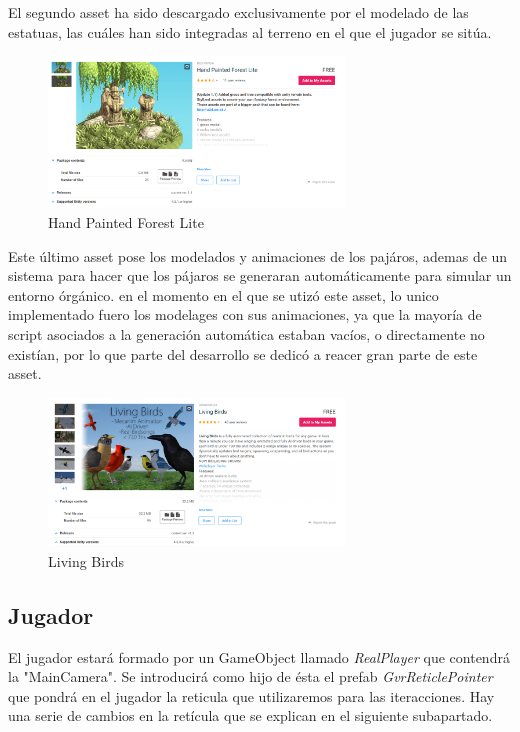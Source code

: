 \quad El segundo asset ha sido descargado exclusivamente por el modelado de las estatuas, las cuáles han sido integradas al terreno en el que el jugador se sitúa. 

\begin{figure}[htb]
	\centering
	\includegraphics[width=0.7\textwidth]{./imagenes/handPaintedForest}
	\caption{Hand Painted Forest Lite}
\end{figure} 

\quad Este último asset pose los modelados y animaciones de los pajáros, ademas de un sistema para hacer que los pájaros se generaran automáticamente para simular un entorno órgánico. en el momento en el que se utizó este asset, lo unico implementado fuero los modelages con sus animaciones, ya que la mayoría de script asociados a la generación automática estaban vacíos, o directamente no existían, por lo que parte del desarrollo se dedicó a reacer gran parte de este asset.

\begin{figure}[htb]
	\centering
	\includegraphics[width=0.7\textwidth]{./imagenes/livingBirds}
	\caption{Living Birds}
\end{figure} 

\subsection{Jugador}

\quad El jugador estará formado por un GameObject llamado \textit{RealPlayer} que contendrá la "MainCamera". Se introducirá como hijo de ésta el prefab \textit{GvrReticlePointer} que pondrá en el jugador la reticula que utilizaremos para las iteracciones. Hay una serie de cambios en la retícula que se explican en el siguiente subapartado.\\

